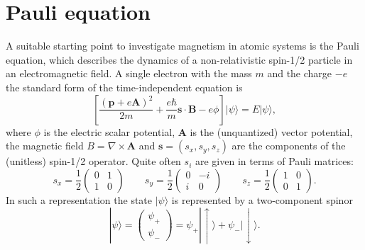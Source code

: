 
%
\section{Pauli equation}
A suitable starting point to investigate magnetism in atomic systems is the Pauli equation, which describes the dynamics of a non-relativistic spin-1/2 particle in an electromagnetic field. A single electron with the mass $m$ and the charge $-e$ the standard form of the time-independent equation is
\begin{equation}
\left[\frac{(\mathbf{p} + e \mathbf{A})^2}{2m} + \frac{e \hbar}{m} \mathbf{s} \cdot \mathbf{B} - e \phi \right] | \psi \rangle = E | \psi \rangle,
\end{equation}
where $\phi$ is the electric scalar potential, $\mathbf{A}$ is the (unquantized) vector potential, the magnetic field $B=\nabla \times \mathbf{A}$ and $\mathbf{s} = (s_x,s_y,s_z)$ are the components of the (unitless) spin-1/2 operator. Quite often $s_i$ are given in terms of Pauli matrices:
\begin{equation}
s_x = \frac{1}{2}\left( \begin{matrix}
0 & 1 \\
1 & 0 
\end{matrix} \right)
\qquad 
s_y = \frac{1}{2}\left( \begin{matrix}
0 & -i \\
i & 0 
\end{matrix} \right) 
\qquad
s_z = \frac{1}{2}\left( \begin{matrix}
1 & 0 \\
0 & 1 
\end{matrix} \right).
\end{equation}
In such a representation the state $| \psi \rangle$ is represented by a two-component spinor
\begin{equation}
| \psi \rangle = \left( \begin{matrix} \psi_+ \\ \psi_- \end{matrix} \right) =
\psi_+ |\uparrow \rangle + \psi_- | \downarrow \rangle
.
\end{equation}


